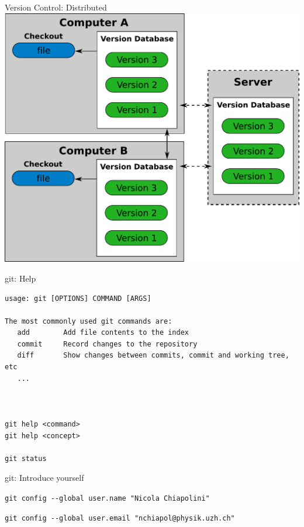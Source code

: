 \documentclass{beamer}
\newcommand{\git}{git\xspace}
\begin{document}

\begin{frame}{Version Control: Distributed}
\centering
  \includegraphics[height=0.8\textheight]{own_fig/vc_distributed}
\end{frame}


\begin{frame}[fragile]{\git: Help}
\footnotesize
\begin{verbatim}
usage: git [OPTIONS] COMMAND [ARGS]

The most commonly used git commands are:
   add        Add file contents to the index
   commit     Record changes to the repository
   diff       Show changes between commits, commit and working tree, etc
   ...



git help <command>
git help <concept>  

git status

\end{verbatim}
\end{frame}


\begin{frame}{\git: Introduce yourself}
  \begin{center}
    \small
    \texttt{git config -{}-global user.name "Nicola Chiapolini"}
  \end{center}
  \vspace{0.2cm}
  \begin{center}
    \small
    \texttt{git config -{}-global user.email "nchiapol@physik.uzh.ch"}
  \end{center}
\end{frame}
\end{document}
